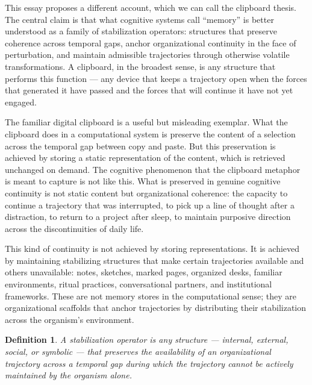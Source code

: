 \documentclass[12pt,a4paper]{report}
\theoremstyle{flyxion}
\newtheorem{definition}[theorem]{Definition}
\begin{document}
This essay proposes a different account, which we can call the clipboard thesis. The central claim is that what cognitive systems call ``memory'' is better understood as a family of stabilization operators: structures that preserve coherence across temporal gaps, anchor organizational continuity in the face of perturbation, and maintain admissible trajectories through otherwise volatile transformations. A clipboard, in the broadest sense, is any structure that performs this function --- any device that keeps a trajectory open when the forces that generated it have passed and the forces that will continue it have not yet engaged.

The familiar digital clipboard is a useful but misleading exemplar. What the clipboard does in a computational system is preserve the content of a selection across the temporal gap between copy and paste. But this preservation is achieved by storing a static representation of the content, which is retrieved unchanged on demand. The cognitive phenomenon that the clipboard metaphor is meant to capture is not like this. What is preserved in genuine cognitive continuity is not static content but organizational coherence: the capacity to continue a trajectory that was interrupted, to pick up a line of thought after a distraction, to return to a project after sleep, to maintain purposive direction across the discontinuities of daily life.

This kind of continuity is not achieved by storing representations. It is achieved by maintaining stabilizing structures that make certain trajectories available and others unavailable: notes, sketches, marked pages, organized desks, familiar environments, ritual practices, conversational partners, and institutional frameworks. These are not memory stores in the computational sense; they are organizational scaffolds that anchor trajectories by distributing their stabilization across the organism's environment.

\begin{definition}
A \emph{stabilization operator} is any structure --- internal, external, social, or symbolic --- that preserves the availability of an organizational trajectory across a temporal gap during which the trajectory cannot be actively maintained by the organism alone.
\end{definition}
\end{document}

